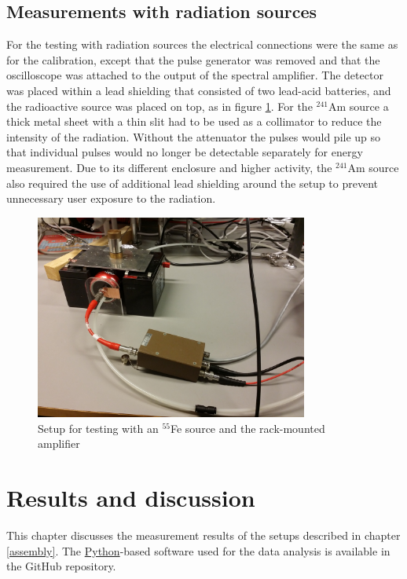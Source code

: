 \documentclass[a4paper]{article}
\begin{document}
\subsection{Measurements with radiation sources}
\label{setup_testing}
For the testing with radiation sources the electrical connections were the same as for the calibration, except that the pulse generator was removed and that the oscilloscope was attached to the output of the spectral amplifier.
The detector was placed within a lead shielding that consisted of two lead-acid batteries, and the radioactive source was placed on top, as in figure \ref{fig:setup_testing}.
For the $^{241}$Am source a thick metal sheet with a thin slit had to be used as a collimator to reduce the intensity of the radiation.
Without the attenuator the pulses would pile up so that individual pulses would no longer be detectable separately for energy measurement.
Due to its different enclosure and higher activity, the $^{241}$Am source also required the use of additional lead shielding around the setup to prevent unnecessary user exposure to the radiation.

\begin{figure}[ht!]
\centering
\includegraphics[width=0.8\textwidth]{fig/IMG_20201130_144418.jpg}
\caption{Setup for testing with an $^{55}$Fe source and the rack-mounted amplifier}
\label{fig:setup_testing}
\end{figure}



\clearpage
\section{Results and discussion}
\label{results}
This chapter discusses the measurement results of the setups described in chapter \ref{assembly}.
The
\href{https://en.wikipedia.org/wiki/Python_(programming_language)}{Python}-based
software used for the data analysis is available in the GitHub repository. \cite{repo}
\end{document}
